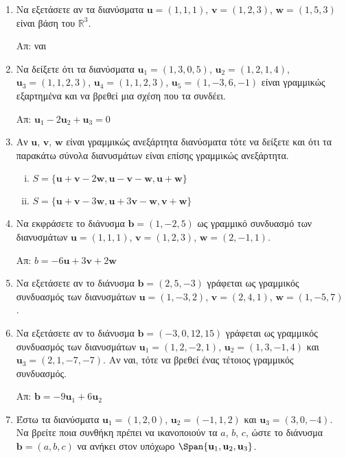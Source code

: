 \begin{enumerate}
	\item Να εξετάσετε αν τα διανύσματα $ \mathbf{u} = (1,1,1)$, $ \mathbf{v} = (1,2,3)$, $
		\mathbf{w} = (1,5,3) $ είναι βάση του $\mathbb{R}^{3}$. 

		\hfill Απ: ναι 

	\item Να δείξετε ότι τα διανύσματα $ \mathbf{u}_{1} = (1,3,0,5) $, $ \mathbf{u}_{2} = (1,2,1,4)
		$, $ \mathbf{u}_{3} = (1,1,2,3)$, $ \mathbf{u}_{4} = (1,1,2,3) $, $ \mathbf{u}_{5} =
		(1,-3,6,-1) $ είναι γραμμικώς εξαρτημένα και να βρεθεί μια σχέση που τα συνδέει. 

		\hfill Απ: $ \mathbf{u}_{1} - 2 \mathbf{u}_{2} + \mathbf{u}_{3} = 0 $ 

	\item Αν $ \mathbf{u} $, $ \mathbf{v} $, $ \mathbf{w} $ είναι γραμμικώς ανεξάρτητα διανύσματα
		τότε να δείξετε και ότι τα παρακάτω σύνολα διανυσμάτων είναι επίσης γραμμικώς ανεξάρτητα.
		\begin{enumerate}[(i)]
			\item $ S = \{ \mathbf{u} + \mathbf{v} - 2 \mathbf{w}, \mathbf{u} - \mathbf{v} -
				\mathbf{w}, \mathbf{u} + \mathbf{w} \} $
			\item $ S = \{ \mathbf{u} + \mathbf{v} - 3 \mathbf{w}, \mathbf{u} + 3 \mathbf{v} -
				\mathbf{w}, \mathbf{v} + \mathbf{w}\}  $
		\end{enumerate}


	\item Να εκφράσετε το διάνυσμα $ \mathbf{b} = (1,-2,5) $ ως γραμμικό συνδυασμό των διανυσμάτων $
		\mathbf{u} = (1,1,1)$, $ \mathbf{v} = (1,2,3)$, $ \mathbf{w} = (2,-1,1) $.

		\hfill Απ: $ b = -6 \mathbf{u} + 3 \mathbf{v} +2 \mathbf{w} $ 	

	\item Να εξετάσετε αν το διάνυσμα $ \mathbf{b} = (2,5,-3) $ γράφεται ως γραμμικός συνδυασμός των διανυσμάτων $ \mathbf{u} = (1,-3,2)$, $ \mathbf{v} = (2,4,1)$, $ \mathbf{w} = (1,-5,7) $.

	\item Να εξετάσετε αν το διάνυσμα $ \mathbf{b} = (-3,0,12,15) $ γράφεται ως γραμμικός συνδυασμός
		των διανυσμάτων $ \mathbf{u}_{1} = (1,2,-2,1) $, $ \mathbf{u}_{2} = (1,3,-1,4) $ και $
		\mathbf{u}_{3} = (2,1,-7,-7) $. Αν ναι, τότε να βρεθεί ένας τέτοιος γραμμικός συνδυασμός.

		\hfill Απ: $ \mathbf{b} = -9 \mathbf{u}_{1} + 6 \mathbf{u}_{2} $ 

	\item Έστω τα διανύσματα $ \mathbf{u}_{1} = (1,2,0) $, $ \mathbf{u}_{2} = (-1,1,2) $ και $
		\mathbf{u}_{3} = (3,0,-4) $. Να βρείτε ποια συνθήκη πρέπει να ικανοποιούν τα $a$, $b$, $c$,
		ώστε το διάνυσμα $ \mathbf{b} = (a,b,c) $ να ανήκει στον υπόχωρο $ \Span \{ \mathbf{u}_{1},
		\mathbf{u}_{2}, \mathbf{u}_{3} \} $.


\end{enumerate}
